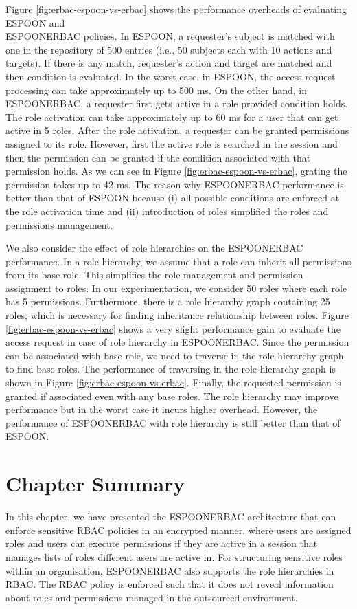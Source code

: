 \documentclass[epsfig,a4paper,11pt,titlepage]{book}
\numberwithin{algorithm}{chapter}
\begin{document}
Figure \ref{fig:erbac-espoon-vs-erbac} shows the performance overheads of evaluating \gls{ESPOON} and \\ \gls{ESPOONERBAC} policies. In \gls{ESPOON}, a requester's subject is matched with one in the repository of 500 entries (i.e., 50 subjects each with 10 actions and targets). If there is any match, requester's action and target are matched and then condition is evaluated. In the worst case, in \gls{ESPOON}, the access request processing can take approximately up to 500 \gls{ms}. On the other hand, in \gls{ESPOONERBAC}, a requester first gets active in a role provided condition holds. The role activation can take approximately up to 60 \gls{ms} for a user that can get active in 5 roles. After the role activation, a requester can be granted permissions assigned to its role. However, first the active role is searched in the session and then the permission can be granted if the condition associated with that permission holds. As we can see in Figure \ref{fig:erbac-espoon-vs-erbac}, grating the permission takes up to 42 \gls{ms}. The reason why \gls{ESPOONERBAC} performance is better than that of \gls{ESPOON} because (i) all possible conditions are enforced at the role activation time and (ii) introduction of roles simplified the roles and permissions management.

We also consider the effect of role hierarchies on the \gls{ESPOONERBAC} performance. In a role hierarchy, we assume that a role can inherit all permissions from its base role. This simplifies the role management and permission assignment to roles. In our experimentation, we consider 50 roles where each role has 5 permissions. Furthermore, there is a role hierarchy graph containing 25 roles, which is necessary for finding inheritance relationship between roles. Figure \ref{fig:erbac-espoon-vs-erbac} shows a very slight performance gain to evaluate the access request in case of role hierarchy in \gls{ESPOONERBAC}. Since the permission can be associated with base role, we need to traverse in the role hierarchy graph to find base roles. The performance of traversing in the role hierarchy graph is shown in Figure \ref{fig:erbac-espoon-vs-erbac}. Finally, the requested permission is granted if associated even with any base roles. The role hierarchy may improve performance but in the worst case it incurs higher overhead. However, the performance of \gls{ESPOONERBAC} with role hierarchy is still better than that of \gls{ESPOON}.

\section{Chapter Summary}
\label{sec:erbac-summary}
In this chapter, we have presented the \gls{ESPOONERBAC} architecture that can enforce sensitive \gls{RBAC} policies in an encrypted manner, where users are assigned roles and users can execute permissions if they are active in a session that manages lists of roles different users are active in. For structuring sensitive roles within an organisation, \gls{ESPOONERBAC} also supports the role hierarchies in \gls{RBAC}. The \gls{RBAC} policy is enforced such that it does not reveal information about roles and permissions managed in the outsourced environment.
\end{document}
